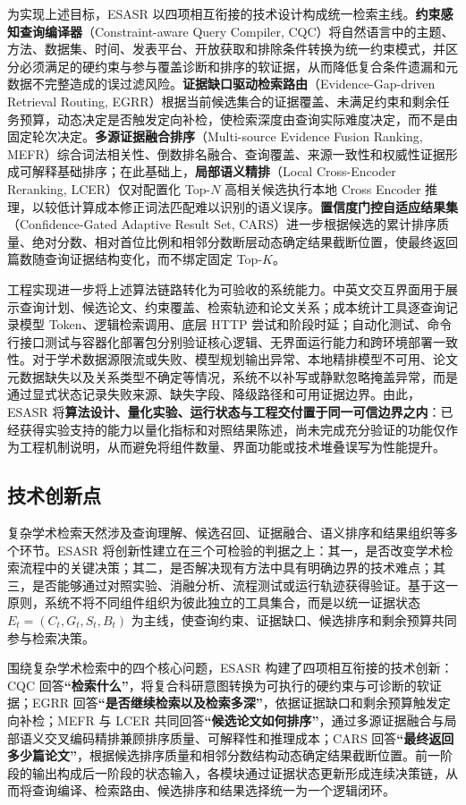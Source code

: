 \documentclass[a4paper,12pt,fontset=none]{ctexart}
\begin{document}
为实现上述目标，ESASR 以四项相互衔接的技术设计构成统一检索主线。\textbf{约束感知查询编译器}（Constraint-aware Query Compiler, CQC）将自然语言中的主题、方法、数据集、时间、发表平台、开放获取和排除条件转换为统一约束模式，并区分必须满足的硬约束与参与覆盖诊断和排序的软证据，从而降低复合条件遗漏和元数据不完整造成的误过滤风险。\textbf{证据缺口驱动检索路由}（Evidence-Gap-driven Retrieval Routing, EGRR）根据当前候选集合的证据覆盖、未满足约束和剩余任务预算，动态决定是否触发定向补检，使检索深度由查询实际难度决定，而不是由固定轮次决定。\textbf{多源证据融合排序}（Multi-source Evidence Fusion Ranking, MEFR）综合词法相关性、倒数排名融合、查询覆盖、来源一致性和权威性证据形成可解释基础排序；在此基础上，\textbf{局部语义精排}（Local Cross-Encoder Reranking, LCER）仅对配置化 Top-$N$ 高相关候选执行本地 Cross Encoder 推理，以较低计算成本修正词法匹配难以识别的语义误序。\textbf{置信度门控自适应结果集}（Confidence-Gated Adaptive Result Set, CARS）进一步根据候选的累计排序质量、绝对分数、相对首位比例和相邻分数断层动态确定结果截断位置，使最终返回篇数随查询证据结构变化，而不绑定固定 Top-$K$。

工程实现进一步将上述算法链路转化为可验收的系统能力。中英文交互界面用于展示查询计划、候选论文、约束覆盖、检索轨迹和论文关系；成本统计工具逐查询记录模型 Token、逻辑检索调用、底层 HTTP 尝试和阶段时延；自动化测试、命令行接口测试与容器化部署包分别验证核心逻辑、无界面运行能力和跨环境部署一致性。对于学术数据源限流或失败、模型规划输出异常、本地精排模型不可用、论文元数据缺失以及关系类型不确定等情况，系统不以补写或静默忽略掩盖异常，而是通过显式状态记录失败来源、缺失字段、降级路径和可用证据边界。由此，ESASR 将\textbf{算法设计、量化实验、运行状态与工程交付置于同一可信边界之内}：已经获得实验支持的能力以量化指标和对照结果陈述，尚未完成充分验证的功能仅作为工程机制说明，从而避免将组件数量、界面功能或技术堆叠误写为性能提升。

\subsection{技术创新点}

复杂学术检索天然涉及查询理解、候选召回、证据融合、语义排序和结果组织等多个环节。ESASR 将创新性建立在三个可检验的判据之上：其一，是否改变学术检索流程中的关键决策；其二，是否解决现有方法中具有明确边界的技术难点；其三，是否能够通过对照实验、消融分析、流程测试或运行轨迹获得验证。基于这一原则，系统不将不同组件组织为彼此独立的工具集合，而是以统一证据状态 $E_t=(C_t,G_t,S_t,B_t)$ 为主线，使查询约束、证据缺口、候选排序和剩余预算共同参与检索决策。

围绕复杂学术检索中的四个核心问题，ESASR 构建了四项相互衔接的技术创新：CQC 回答\textbf{``检索什么''}，将复合科研意图转换为可执行的硬约束与可诊断的软证据；EGRR 回答\textbf{``是否继续检索以及检索多深''}，依据证据缺口和剩余预算触发定向补检；MEFR 与 LCER 共同回答\textbf{``候选论文如何排序''}，通过多源证据融合与局部语义交叉编码精排兼顾排序质量、可解释性和推理成本；CARS 回答\textbf{``最终返回多少篇论文''}，根据候选排序质量和相邻分数结构动态确定结果截断位置。前一阶段的输出构成后一阶段的状态输入，各模块通过证据状态更新形成连续决策链，从而将查询编译、检索路由、候选排序和结果选择统一为一个逻辑闭环。
\end{document}
